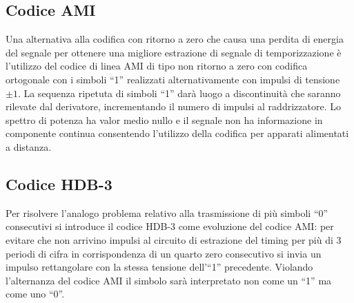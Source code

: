 \subsection{Codice \ac{AMI}}
Una alternativa alla codifica con ritorno a zero che causa una perdita di energia del segnale per ottenere una migliore estrazione di segnale di temporizzazione è l'utilizzo del codice di linea \ac{AMI} di tipo non ritorno a zero con codifica ortogonale con i simboli “1” realizzati alternativamente con impulsi di tensione $\pm 1$. La sequenza ripetuta di simboli “1” darà luogo a discontinuità che saranno rilevate dal derivatore, incrementando il numero di impulsi al raddrizzatore. Lo spettro di potenza ha valor medio nullo e il segnale non ha informazione in componente continua consentendo l'utilizzo della codifica per apparati alimentati a distanza.

\begin{figure}[ht!]\centering
{}
%
\end{figure}

\subsection{Codice \ac{HDB-3}}
Per risolvere l'analogo problema relativo alla trasmissione di più simboli “0” consecutivi si introduce il codice \ac{HDB-3} come evoluzione del codice \ac{AMI}: per evitare che non arrivino impulsi al circuito di estrazione del timing per più di 3 periodi di cifra in corrispondenza di un quarto zero consecutivo si invia un impulso rettangolare con la stessa tensione dell'“1” precedente. Violando l'alternanza del codice \ac{AMI} il simbolo sarà interpretato non come un “1” ma come uno “0”. 

